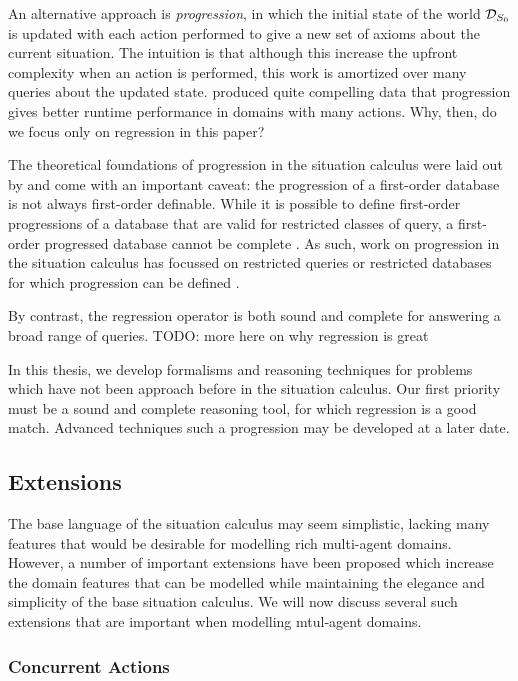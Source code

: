 An alternative approach is \emph{progression}, in which the initial
state of the world $\mathcal{D}_{S_{0}}$ is updated with each action performed
to give a new set of axioms about the current situation. The intuition
is that although this increase the upfront complexity when an action
is performed, this work is amortized over many queries about the updated
state. \citet{thielscher04case_for_progression} produced quite compelling
data that progression gives better runtime performance in domains
with many actions. Why, then, do we focus only on regression in this
paper?

The theoretical foundations of progression in the situation calculus
were laid out by \citet{reiter97progression} and come with an important
caveat: the progression of a first-order database is not always first-order
definable. While it is possible to define first-order progressions
of a database that are valid for restricted classes of query, a first-order
progressed database cannot be complete \citep{vassos08progression_future_queries}.
As such, work on progression in the situation calculus has focussed
on restricted queries or restricted databases for which progression
can be defined \citep{liu05sc_progression_knowledge,vassos07progression}.

By contrast, the regression operator is both sound and complete for
answering a broad range of queries. TODO: more here on why regression
is great

In this thesis, we develop formalisms and reasoning techniques for
problems which have not been approach before in the situation calculus.
Our first priority must be a sound and complete reasoning tool, for
which regression is a good match. Advanced techniques such a progression
may be developed at a later date.


\subsection{Extensions}

The base language of the situation calculus may seem simplistic, lacking
many features that would be desirable for modelling rich multi-agent
domains. However, a number of important extensions have been proposed
which increase the domain features that can be modelled while maintaining
the elegance and simplicity of the base situation calculus. We will
now discuss several such extensions that are important when modelling
mtul-agent domains.


\subsubsection{Concurrent Actions}

